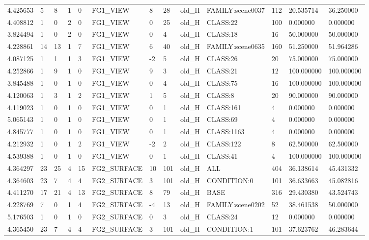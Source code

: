 \begin{tabular}{lllllllllllll}
4.425653 & 5 & 8 & 1 & 0 & FG1\_VIEW & 8 & 28 & old\_H & FAMILY:scene0037 & 112 & 20.535714 & 36.250000 \\
4.408812 & 1 & 0 & 2 & 0 & FG1\_VIEW & 0 & 25 & old\_H & CLASS:22 & 100 & 0.000000 & 0.000000 \\
3.824494 & 1 & 0 & 2 & 0 & FG1\_VIEW & 0 & 4 & old\_H & CLASS:18 & 16 & 50.000000 & 50.000000 \\
4.228861 & 14 & 13 & 1 & 7 & FG1\_VIEW & 6 & 40 & old\_H & FAMILY:scene0635 & 160 & 51.250000 & 51.964286 \\
4.087125 & 1 & 1 & 1 & 3 & FG1\_VIEW & -2 & 5 & old\_H & CLASS:26 & 20 & 75.000000 & 75.000000 \\
4.252866 & 1 & 9 & 1 & 0 & FG1\_VIEW & 9 & 3 & old\_H & CLASS:21 & 12 & 100.000000 & 100.000000 \\
3.845488 & 1 & 0 & 1 & 0 & FG1\_VIEW & 0 & 4 & old\_H & CLASS:75 & 16 & 100.000000 & 100.000000 \\
4.120063 & 1 & 3 & 1 & 2 & FG1\_VIEW & 1 & 5 & old\_H & CLASS:8 & 20 & 90.000000 & 90.000000 \\
4.119023 & 1 & 0 & 1 & 0 & FG1\_VIEW & 0 & 1 & old\_H & CLASS:161 & 4 & 0.000000 & 0.000000 \\
5.065143 & 1 & 0 & 1 & 0 & FG1\_VIEW & 0 & 1 & old\_H & CLASS:69 & 4 & 0.000000 & 0.000000 \\
4.845777 & 1 & 0 & 1 & 0 & FG1\_VIEW & 0 & 1 & old\_H & CLASS:1163 & 4 & 0.000000 & 0.000000 \\
4.212932 & 1 & 0 & 1 & 2 & FG1\_VIEW & -2 & 2 & old\_H & CLASS:122 & 8 & 62.500000 & 62.500000 \\
4.539388 & 1 & 0 & 1 & 0 & FG1\_VIEW & 0 & 1 & old\_H & CLASS:41 & 4 & 100.000000 & 100.000000 \\
4.364297 & 23 & 25 & 4 & 15 & FG2\_SURFACE & 10 & 101 & old\_H & ALL & 404 & 36.138614 & 45.431332 \\
4.364603 & 23 & 7 & 4 & 4 & FG2\_SURFACE & 3 & 101 & old\_H & CONDITION:0 & 101 & 36.633663 & 45.082816 \\
4.411270 & 17 & 21 & 4 & 13 & FG2\_SURFACE & 8 & 79 & old\_H & BASE & 316 & 29.430380 & 43.524743 \\
4.228769 & 7 & 0 & 1 & 4 & FG2\_SURFACE & -4 & 13 & old\_H & FAMILY:scene0202 & 52 & 38.461538 & 50.000000 \\
5.176503 & 1 & 0 & 1 & 0 & FG2\_SURFACE & 0 & 3 & old\_H & CLASS:24 & 12 & 0.000000 & 0.000000 \\
4.365450 & 23 & 7 & 4 & 4 & FG2\_SURFACE & 3 & 101 & old\_H & CONDITION:1 & 101 & 37.623762 & 46.283644 \\

\end{tabular}
